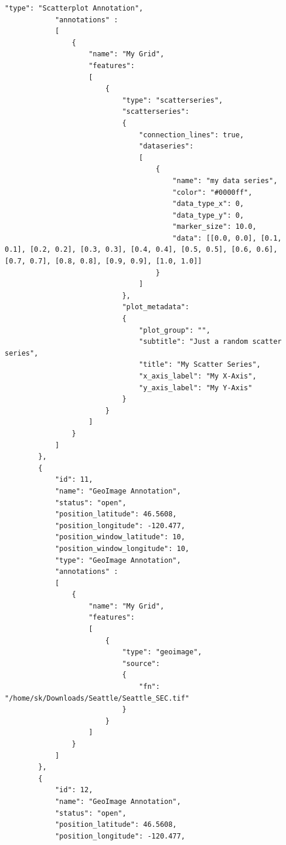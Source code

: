 \begin{lstlisting}[basicstyle=\small\ttfamily]
            "type": "Scatterplot Annotation",
            "annotations" :
            [
                {
                    "name": "My Grid",
                    "features":
                    [
                        {
                            "type": "scatterseries",
                            "scatterseries": 
                            {
                                "connection_lines": true,
                                "dataseries": 
                                [
                                    {
                                        "name": "my data series",
                                        "color": "#0000ff",
                                        "data_type_x": 0,
                                        "data_type_y": 0,
                                        "marker_size": 10.0,
                                        "data": [[0.0, 0.0], [0.1, 0.1], [0.2, 0.2], [0.3, 0.3], [0.4, 0.4], [0.5, 0.5], [0.6, 0.6], [0.7, 0.7], [0.8, 0.8], [0.9, 0.9], [1.0, 1.0]]
                                    }
                                ]
                            },
                            "plot_metadata":
                            {
                                "plot_group": "",
                                "subtitle": "Just a random scatter series",
                                "title": "My Scatter Series",
                                "x_axis_label": "My X-Axis",
                                "y_axis_label": "My Y-Axis"
                            }
                        }      
                    ]
                }
            ]
        },
        {
            "id": 11,
            "name": "GeoImage Annotation",
            "status": "open",
            "position_latitude": 46.5608,
            "position_longitude": -120.477,
            "position_window_latitude": 10,
            "position_window_longitude": 10,
            "type": "GeoImage Annotation",
            "annotations" :
            [
                {
                    "name": "My Grid",
                    "features":
                    [
                        {
                            "type": "geoimage",
                            "source": 
                            {
                                "fn": "/home/sk/Downloads/Seattle/Seattle_SEC.tif"
                            }
                        }
                    ]
                }
            ]
        },
        {
            "id": 12,
            "name": "GeoImage Annotation",
            "status": "open",
            "position_latitude": 46.5608,
            "position_longitude": -120.477,

\end{lstlisting}

